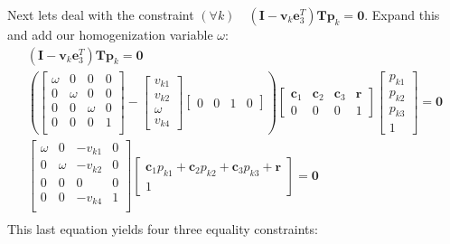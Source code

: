 \documentclass{article}
\begin{document}
Next lets deal with the constraint $(\forall k) \quad (\mathbf{I} - \mathbf{v}_k \mathbf{e}_3^T) \mathbf{T} \mathbf{p}_k = \mathbf{0}$. Expand this and add our homogenization variable $\omega$:
\begin{align}
    (\mathbf{I} - \mathbf{v}_k \mathbf{e}_3^T) \mathbf{T} \mathbf{p}_k = \mathbf{0} \\
    \left( \begin{bmatrix}
        \omega & 0 & 0 & 0 \\
        0 & \omega & 0 & 0 \\
        0 & 0 & \omega & 0 \\ 
        0 & 0 & 0 & 1 \\
    \end{bmatrix} - \begin{bmatrix}
        v_{k1} \\
        v_{k2} \\
        \omega \\
        v_{k4} 
    \end{bmatrix} \begin{bmatrix}
        0 & 0 & 1 & 0
    \end{bmatrix} \right) \begin{bmatrix}
        \mathbf{c}_1 & \mathbf{c}_2 & \mathbf{c}_3 & \mathbf{r} \\
        0 & 0 & 0 & 1
    \end{bmatrix} \begin{bmatrix}
        p_{k1} \\
        p_{k2} \\
        p_{k3} \\
        1
    \end{bmatrix} = \mathbf{0} \\
    \begin{bmatrix}
        \omega & 0 & -v_{k1} & 0 \\
        0 & \omega & -v_{k2} & 0 \\
        0 & 0 & 0 & 0 \\
        0 & 0 & -v_{k4} & 1 \\
    \end{bmatrix} \begin{bmatrix}
        \mathbf{c}_1 p_{k1} + \mathbf{c}_2 p_{k2} + \mathbf{c}_3 p_{k3} + \mathbf{r} \\
        1
    \end{bmatrix} = \mathbf{0} \\
\end{align}
This last equation yields four three equality constraints:
\end{document}
